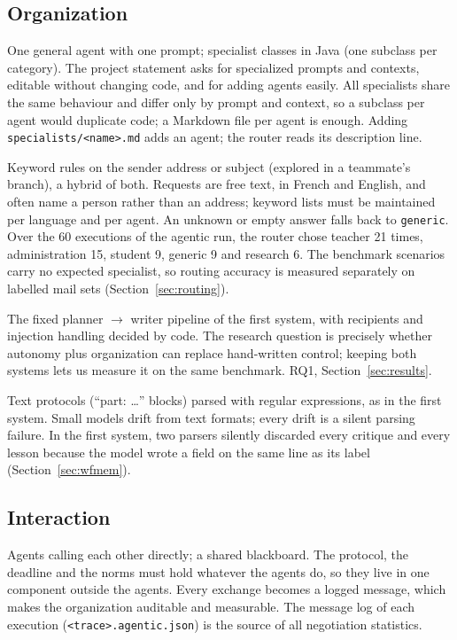 \documentclass[11pt,a4paper]{article}
\newcommand{\code}[1]{\texttt{#1}}
\begin{document}
\subsection{Organization}
{One general agent with one prompt; specialist classes in Java (one subclass per category).}
{The project statement asks for specialized prompts and contexts, editable without changing code, and for adding agents
easily. All specialists share the same behaviour and differ only by prompt and context, so a subclass per agent
would duplicate code; a Markdown file per agent is enough.}
{Adding \code{specialists/<name>.md} adds an agent; the router reads its description line.}

{Keyword rules on the sender address or subject (explored in a teammate's branch), a hybrid of both.}
{Requests are free text, in French and English, and often name a person rather than an address; keyword lists must
be maintained per language and per agent. An unknown or empty answer falls back to \code{generic}.}
{Over the 60 executions of the agentic run, the router chose teacher 21 times, administration 15, student 9,
generic 9 and research 6. The benchmark scenarios carry no expected specialist, so routing accuracy is measured
separately on labelled mail sets (Section~\ref{sec:routing}).}

{The fixed planner $\rightarrow$ writer pipeline of the first system, with recipients and injection handling
decided by code.}
{The research question is precisely whether autonomy plus organization can replace hand-written control; keeping
both systems lets us measure it on the same benchmark.}
{RQ1, Section~\ref{sec:results}.}

{Text protocols (``part: \ldots'' blocks) parsed with regular expressions, as in the first system.}
{Small models drift from text formats; every drift is a silent parsing failure.}
{In the first system, two parsers silently discarded every critique and every lesson because the model wrote a
field on the same line as its label (Section~\ref{sec:wfmem}).}

\subsection{Interaction}
{Agents calling each other directly; a shared blackboard.}
{The protocol, the deadline and the norms must hold whatever the agents do, so they live in one component outside
the agents. Every exchange becomes a logged message, which makes the organization auditable and measurable.}
{The message log of each execution (\code{<trace>.agentic.json}) is the source of all negotiation statistics.}
\end{document}
